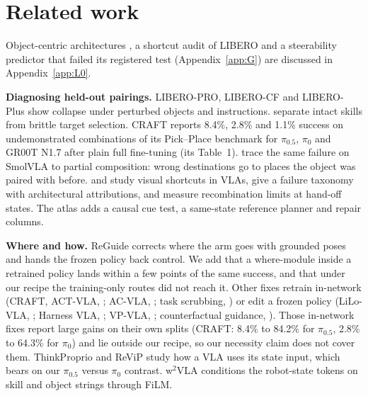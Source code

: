 \documentclass{article}
\newcommand{\pifive}{$\pi_{0.5}$}
\newcommand{\pizero}{$\pi_0$}
\begin{document}
\section{Related work}
\label{sec:related}

Object-centric architectures \citep{taxpose2211,spot2411,foci2609,oawam2605,potvla2607}, a shortcut audit of LIBERO \citep{jiangaudit2606} and a steerability predictor that failed its registered test (Appendix~\ref{app:G}) are discussed in Appendix~\ref{app:L0}.

\textbf{Diagnosing held-out pairings.} LIBERO-PRO, LIBERO-CF and LIBERO-Plus \citep{liberoplus2510} show collapse under perturbed objects and instructions. \citet{emukpere2602} separate intact skills from brittle target selection. CRAFT reports 8.4\%, 2.8\% and 1.1\% success on undemonstrated combinations of its Pick--Place benchmark for \pifive, \pizero{} and GR00T N1.7 after plain full fine-tuning (its Table~1). \citet{schmalz2026} trace the same failure on SmolVLA to partial composition: wrong destinations go to places the object was paired with before. \citet{gerigk2610} and \citet{cofact2608} study visual shortcuts in VLAs, \citet{better2604} give a failure taxonomy with architectural attributions, and \citet{robocombine2610} measure recombination limits at hand-off states. The atlas adds a causal cue test, a same-state reference planner and repair columns.

\textbf{Where and how.} ReGuide corrects where the arm goes with grounded poses and hands the frozen policy back control. We add that a where-module inside a retrained policy lands within a few points of the same success, and that under our recipe the training-only routes did not reach it. Other fixes retrain in-network (CRAFT, ACT-VLA, \citealp{actvla2607}; AC-VLA, \citealp{acvla2607}; task scrubbing, \citealp{gerigk2610}) or edit a frozen policy (LiLo-VLA, \citealp{lilovla2602}; Harness VLA, \citealp{harnessvla2607}; VP-VLA, \citealp{vpvla2603}; counterfactual guidance, \citealp{cofact2608}). Those in-network fixes report large gains on their own splits (CRAFT: 8.4\% to 84.2\% for \pifive, 2.8\% to 64.3\% for \pizero) and lie outside our recipe, so our necessity claim does not cover them. ThinkProprio \citep{thinkproprio2602} and ReViP \citep{revip2601} study how a VLA uses its state input, which bears on our \pifive{} versus \pizero{} contrast. w$^{2}$VLA \citep{w2vla2606} conditions the robot-state tokens on skill and object strings through FiLM.
\end{document}
